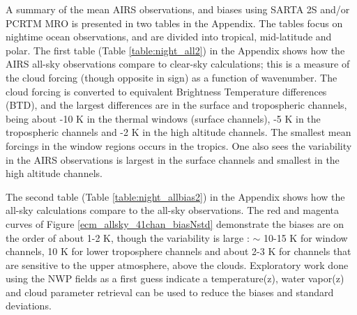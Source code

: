\documentclass[agupp]{aguplus}              %
\begin{document}
\begin{article}
A summary of the mean AIRS observations, and biases using SARTA 2S
and/or PCRTM MRO is presented in two tables in the Appendix. The
tables focus on nightime ocean observations, and are divided into
tropical, mid-latitude and polar. The first table (Table \ref{table:night_all2}) in the Appendix shows
how the AIRS all-sky observations compare to clear-sky calculations;
this is a measure of the cloud forcing (though opposite in sign) as a
function of wavenumber. The cloud forcing is converted to equivalent
Brightness Temperature differences (BTD), and the largest differences
are in the surface and tropospheric channels, being about -10 K in the
thermal windows (surface channels), -5 K in the tropospheric channels
and -2 K in the high altitude channels. The smallest mean forcings
in the window regions occurs in the tropics. One also sees the variability
in the AIRS observations is largest in the surface channels and
smallest in the high altitude channels.

The second table (Table \ref{table:night_allbias2}) in the Appendix
shows how the all-sky calculations compare to the all-sky
observations. The red and magenta curves of Figure
\ref{ecm_allsky_41chan_biasNstd} demonstrate the biases are on the
order of about 1-2 K, though the variability is large : $\sim$ 10-15 K
for window channels, 10 K for lower troposphere channels and about 2-3
K for channels that are sensitive to the upper atmosphere, above the
clouds. Exploratory work done using the NWP fields as a first guess
indicate a temperature(z), water vapor(z) and cloud parameter
retrieval can be used to reduce the biases and standard deviations.


\end{article}
\end{document}
